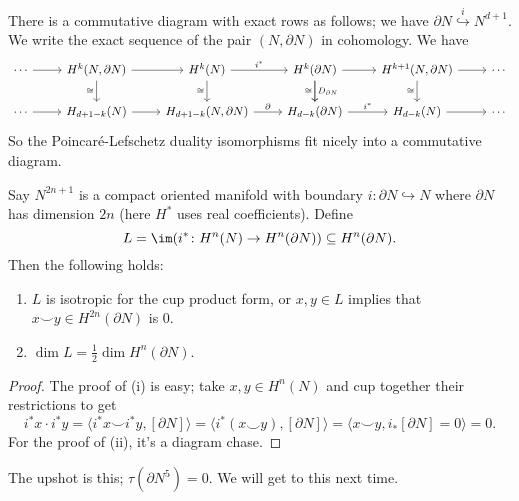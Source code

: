 There is a commutative diagram with exact rows as follows; we have $\partial N \overset{i}{\hookrightarrow}  N ^{d+1}$. We write the exact sequence of the pair $(N, \partial N)$ in cohomology. We have \[
    \begin{tikzcd}
\cdots \arrow[r] & {H^k(N,\partial N)} \arrow[d, "\cong"'] \arrow[r] & H^k(N) \arrow[d, "\cong"'] \arrow[r, "i^*"]     & H^k(\partial N) \arrow[r] \arrow[d, "D_{\partial N}"] \arrow[d, "\cong"'] & {H^{k+1}(N,\partial N)} \arrow[r] \arrow[d, "\cong"'] & \cdots \\
\cdots \arrow[r] & H_{d+1-k}(N) \arrow[r]                            & {H_{d+1-k}(N,\partial N)} \arrow[r, "\partial"] & H_{d-k}(\partial N) \arrow[r, "i^*"]                                      & H_{d-k} (N) \arrow[r]                                 & \cdots
\end{tikzcd}
\] So the Poincar\'e-Lefschetz duality isomorphisms fit nicely into a commutative diagram.
\begin{theorem}
    Say $N ^{2n+1}$ is a compact oriented manifold with boundary $i \colon \partial N \hookrightarrow N $ where $\partial N$ has dimension $2n$ (here $H^*$ uses real coefficients). Define \[
        L = \im (i^* \colon H^n  (N) \to H^n (\partial  N)) \subseteq  H^n (\partial N).
    \] Then the following holds:
    \begin{enumerate}[label=(\roman*)]
    \setlength\itemsep{-.2em}
\item $L$ is isotropic for the cup product form, or $x,y \in L $ implies that $x \smile y \in H^{2n}(\partial N)$ is 0.
\item $\dim L = \frac{1}{2}\dim H^n (\partial N)$.
    \end{enumerate}
\end{theorem}
\begin{proof}
    The proof of (i) is easy; take $x,y \in H^n (N )$ and cup together their restrictions to get
    \[
    i^*x \cdot  i^* y =\langle i^* x \smile i^* y , [\partial  N]\rangle = \langle i^* (x \smile y), [\partial N] \rangle = \langle x \smile y , i_*[\partial N] =0\rangle =0.
\] For the proof of (ii), it's a diagram chase.
\end{proof}
The upshot is this; $\tau(\partial  N^5)=0$. We will get to this next time.

